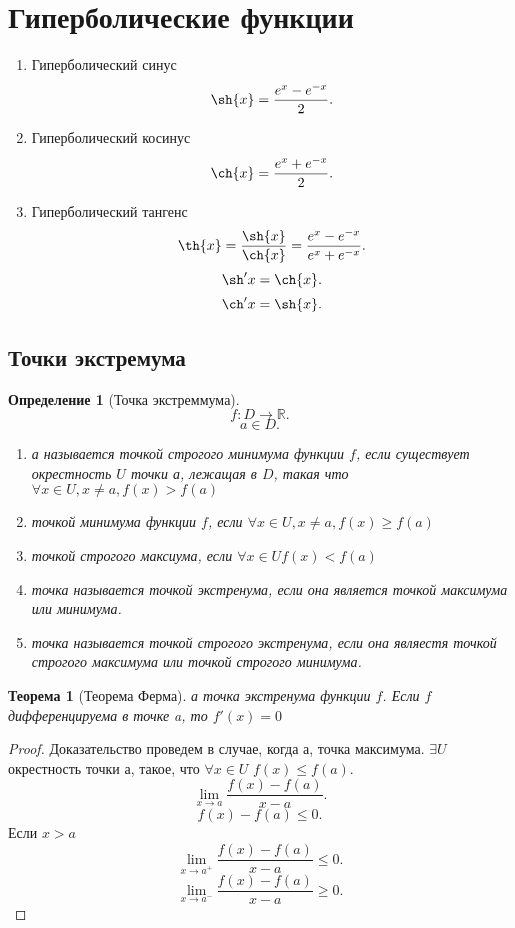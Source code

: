 \documentclass[a4paper]{article}
\newtheorem{theorem}{Теорема}
\newtheorem{definition}{Определение}
\begin{document}
\section{Гиперболические функции}
\begin{enumerate}
    \item Гиперболический синус
        \[
            \sh{x} = \frac{e^x - e^{-x}}{2}
        .\] 
    \item Гиперболический косинус
        \[
            \ch{x} = \frac{e^x + e^{-x}}{2}
        .\] 
    \item Гиперболический тангенс
        \[
            \th{x} = \frac{\sh{x}}{\ch{x}} = \frac{e^x  - e^{ -x }}{e^x + e^{ -x }}
        .\] 
    \[
        \sh'{x} = \ch{x}
    .\] 
    \[
        \ch'{x}  = \sh{x}
    .\] 
\end{enumerate}
\subsection{Точки экстремума}
\begin{definition}[Точка экстреммума]
    \[
    f: D \to \mathbb{R}
    .\] 
    \[
    a \in D
    .\] 
    \begin{enumerate}
        \item 
    а называется точкой строгого минимума функции $f$, если существует окрестность $U$ точки а, лежащая в $D$, такая что  $\forall  x \in U, x\neq a, f(x) > f(a)$
\item  точкой минимума функции $f$, если  $\forall  x \in U, x\neq a, f(x) \ge  f(a)$
\item точкой строгого максиума, если $\forall x 
    \in U f(x) < f(a)$
\item 
    точка называется точкой экстренума, если она является точкой максимума или минимума.
    \item
        точка называется точкой строгого экстренума, если она являестя точкой строгого максимума или точкой строгого минимума.
    \end{enumerate}
\end{definition}
\begin{theorem}[Теорема Ферма]
    а точка экстренума функции $f$. Если  $f$ дифференцируема в точке a, то  $f'(x) = 0$
\end{theorem}
\begin{proof}
    Доказательство проведем в случае, когда а, точка максимума. $\exists U$ окрестность точки а, такое, что $\forall  x  \in U$ $f(x) \le  f(a)$.
     \[
    \lim_{x \to a} \frac{f(x)  -f(a)}{x  -a}
    .\] 
    \[
    f(x) - f(a) \le  0
    .\] 
    Если $x > a$
     \[
         \lim_{x \to a^+} \frac{f(x) -f(a)}{x - a} \le  0
    .\] 
    \[
    \lim_{x \to a^-} \frac{f(x) - f(a)}{x - a} \ge  0
    .\] 
\end{proof}
\end{document}
